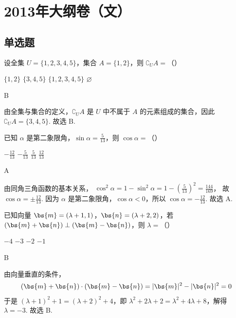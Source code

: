 \chapter{2013年大纲卷（文）}

\section{单选题}

\begin{problem}
设全集 \(U = \{1, 2, 3, 4, 5\}\)，集合 \(A = \{1, 2\}\)，则 \(\complement_U A =\)（\quad）

\choices
    {\( \{1, 2\} \)}
    {\(\{3,4,5\}\)}
    {\( \{1, 2, 3, 4, 5\} \)}
    {\(\varnothing\)}

\begin{answer}
B
\end{answer}

\begin{solution}
由全集与集合的定义，\(\complement_U A\) 是 \(U\) 中不属于 \(A\) 的元素组成的集合，因此
\(\complement_U A=\{3,4,5\}\). 故选 B.
\end{solution}
\end{problem}

\begin{problem}
已知 \(\alpha\) 是第二象限角，\(\sin \alpha = \frac{5}{13}\)，则 \(\cos \alpha =\)（\quad）

\choices
    {\(-\frac{12}{13}\)}
    {\(-\frac{5}{13}\)}
    {\(\frac{5}{13}\)}
    {\(\frac{12}{13}\)}

\begin{answer}
A
\end{answer}

\begin{solution}
由同角三角函数的基本关系，
\(\cos^2\alpha=1-\sin^2\alpha=1-\left(\frac{5}{13}\right)^2=\frac{144}{169}\)，
故 \(\cos\alpha=\pm\frac{12}{13}\). 因为 \(\alpha\) 是第二象限角，\(\cos\alpha<0\)，所以
\(\cos\alpha=-\frac{12}{13}\). 故选 A.
\end{solution}
\end{problem}

\begin{problem}
已知向量 \(\bs{m} = (\lambda + 1, 1)\)，\(\bs{n} = (\lambda + 2, 2)\)，若 \((\bs{m} + \bs{n}) \perp (\bs{m} - \bs{n})\)，则 \(\lambda =\)（\quad）

\choices
    {\(-4\)}
    {\(-3\)}
    {\(-2\)}
    {\(-1\)}

\begin{answer}
B
\end{answer}

\begin{solution}
由向量垂直的条件，
\[
(\bs{m}+\bs{n})\cdot(\bs{m}-\bs{n})=|\bs{m}|^2-|\bs{n}|^2=0
\]
于是 \((\lambda+1)^2+1=(\lambda+2)^2+4\)，即
\(\lambda^2+2\lambda+2=\lambda^2+4\lambda+8\)，解得 \(\lambda=-3\). 故选 B.
\end{solution}
\end{problem}

